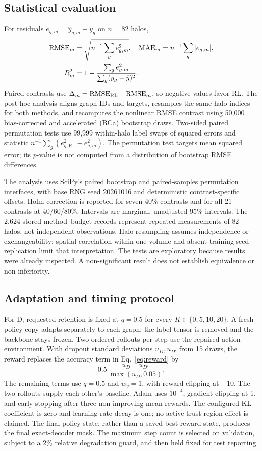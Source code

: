 \subsection{Statistical evaluation}
\label{sec:stats}
For residuals $e_{g,m}=\hat y_{g,m}-y_g$ on $n=82$ halos,
\begin{align}
 \operatorname{RMSE}_m&=\sqrt{n^{-1}\sum_g e_{g,m}^2},\quad
 \operatorname{MAE}_m=n^{-1}\sum_g|e_{g,m}|,\\
 R_m^2&=1-\frac{\sum_g e_{g,m}^2}{\sum_g(y_g-\bar y)^2}.
\end{align}
Paired contrasts use $\Delta_m=\operatorname{RMSE}_{\mathrm{RL}}-\operatorname{RMSE}_m$, so negative values favor RL. The post hoc analysis aligns graph IDs and targets, resamples the same halo indices for both methods, and recomputes the nonlinear RMSE contrast using 50,000 bias-corrected and accelerated (BCa) bootstrap draws. Two-sided paired permutation tests use 99,999 within-halo label swaps of squared errors and statistic $n^{-1}\sum_g(e_{g,\mathrm{RL}}^2-e_{g,m}^2)$. The permutation test targets mean squared error; its $p$-value is not computed from a distribution of bootstrap RMSE differences.

The analysis uses SciPy's paired bootstrap and paired-samples permutation interfaces, with base RNG seed 20261016 and deterministic contrast-specific offsets. Holm correction is reported for seven 40\% contrasts and for all 21 contrasts at 40/60/80\%. Intervals are marginal, unadjusted 95\% intervals. The 2,624 stored method--budget records represent repeated measurements of 82 halos, not independent observations. Halo resampling assumes independence or exchangeability; spatial correlation within one volume and absent training-seed replication limit that interpretation. The tests are exploratory because results were already inspected. A non-significant result does not establish equivalence or non-inferiority.

\subsection{Adaptation and timing protocol}
For D, requested retention is fixed at $q=0.5$ for every $K\in\{0,5,10,20\}$. A fresh policy copy adapts separately to each graph; the label tensor is removed and the backbone stays frozen. Two ordered rollouts per step use the repaired action environment. With dropout standard deviations $u_D,u_{D'}$ from 15 draws, the reward replaces the accuracy term in Eq.~\ref{eq:reward} by
\begin{equation}
 0.5\,\frac{u_D-u_{D'}}{\max(u_D,0.05)}.
\end{equation}
The remaining terms use $q=0.5$ and $w_v=1$, with reward clipping at $\pm10$. The two rollouts supply each other's baseline. Adam uses $10^{-4}$, gradient clipping at 1, and early stopping after three non-improving mean rewards. The configured KL coefficient is zero and learning-rate decay is one; no active trust-region effect is claimed. The final policy state, rather than a saved best-reward state, produces the final exact-decoder mask. The maximum step count is selected on validation, subject to a 2\% relative degradation guard, and then held fixed for test reporting.


